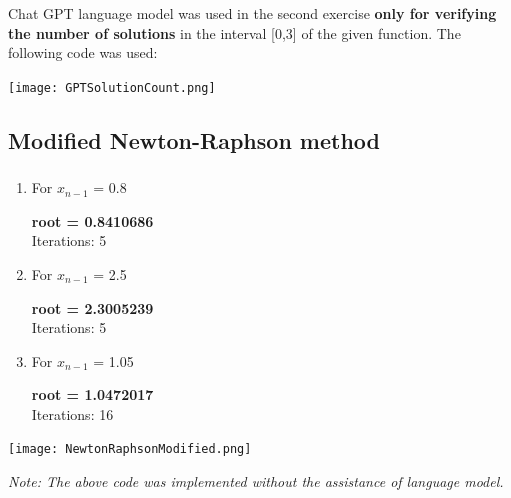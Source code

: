 \documentclass{article}
\begin{document}
Chat GPT language model was used in the second exercise \textbf{only for verifying the number of solutions} in the interval [0,3] of the given function. The following code was used:
\begin{tcolorbox}[colback=gray!10, colframe=gray!80, width=\textwidth, sharp corners]
    \centering 
    \texttt{[image: GPTSolutionCount.png]} 


    \vspace{0.5cm} 
    
\end{tcolorbox}


\vspace{0.7cm}
\subsection{Modified Newton-Raphson method}
\subsubsection{}

\begin{tcolorbox}[colback=blue!10, colframe=gray!80, width=\textwidth, sharp corners]
\begin{enumerate}
\item For $x_{n-1}$ = 0.8
\begin{center}
   \textbf{ root = 0.8410686} \\
    Iterations: 5
\end{center}
\item For $x_{n-1}$ = 2.5
\begin{center}
    \textbf{root = 2.3005239} \\
    Iterations: 5
\end{center}
\item For $x_{n-1}$ = 1.05
\begin{center}
    \textbf{root = 1.0472017} \\
    Iterations: 16
\end{center}



\end{enumerate}
\end{tcolorbox}

\begin{tcolorbox}[colback=gray!10, colframe=gray!80, width=\textwidth, sharp corners]
    \centering 
    \texttt{[image: NewtonRaphsonModified.png]} 


    \vspace{0.5cm} 
    
    
    \small\textit{Note: The above code was implemented without the assistance of language model.}
\end{tcolorbox}
\end{document}
